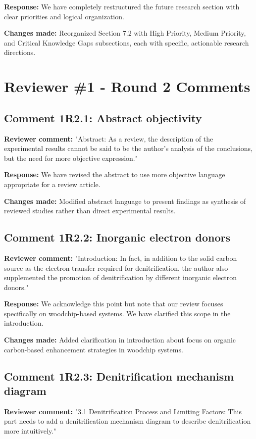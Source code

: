 \documentclass[12pt,a4paper]{article}
\begin{document}
\textbf{Response:} We have completely restructured the future research section with clear priorities and logical organization.

\textbf{Changes made:} Reorganized Section 7.2 with High Priority, Medium Priority, and Critical Knowledge Gaps subsections, each with specific, actionable research directions.

\section{Reviewer \#1 - Round 2 Comments}

\subsection{Comment 1R2.1: Abstract objectivity}
\textbf{Reviewer comment:} "Abstract: As a review, the description of the experimental results cannot be said to be the author's analysis of the conclusions, but the need for more objective expression."

\textbf{Response:} We have revised the abstract to use more objective language appropriate for a review article.

\textbf{Changes made:} Modified abstract language to present findings as synthesis of reviewed studies rather than direct experimental results.

\subsection{Comment 1R2.2: Inorganic electron donors}
\textbf{Reviewer comment:} "Introduction: In fact, in addition to the solid carbon source as the electron transfer required for denitrification, the author also supplemented the promotion of denitrification by different inorganic electron donors."

\textbf{Response:} We acknowledge this point but note that our review focuses specifically on woodchip-based systems. We have clarified this scope in the introduction.

\textbf{Changes made:} Added clarification in introduction about focus on organic carbon-based enhancement strategies in woodchip systems.

\subsection{Comment 1R2.3: Denitrification mechanism diagram}
\textbf{Reviewer comment:} "3.1 Denitrification Process and Limiting Factors: This part needs to add a denitrification mechanism diagram to describe denitrification more intuitively."
\end{document}
